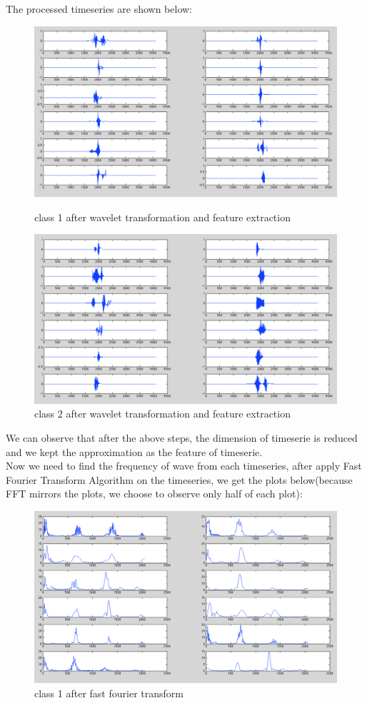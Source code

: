 \begin{enumerate}
The processed timeseries are shown below:\\
\begin{figure}[H]
\includegraphics[scale=.4]{PIC/extracted_class1.png}
\caption{class 1 after wavelet transformation and feature extraction}

\includegraphics[scale=.4]{PIC/extracted_class2.png}
\caption{class 2 after wavelet transformation and feature extraction}
\end{figure}
We can observe that after the above steps, the dimension of timeserie is reduced and we kept the approximation as the feature of timeserie.\\
Now we need to find the frequency of wave from each timeseries, after apply Fast Fourier Transform Algorithm on the timeseries, we get the plots below(because FFT mirrors the plots, we choose to observe only half of each plot):\\
\begin{figure}[H]

\includegraphics[scale=.4]{PIC/extracted_ffted_class1.png}
\caption{class 1 after fast fourier transform}


\end{figure}
\end{enumerate}
